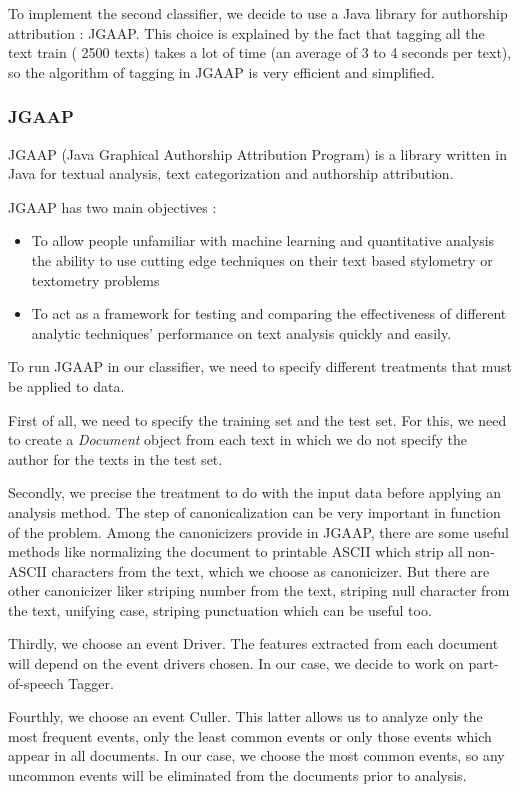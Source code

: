 \label{lab:clas2}


To implement the second classifier, we decide to use a Java library for authorship attribution : JGAAP. This choice is explained by the fact that tagging all the text train ( 2500 texts) takes a lot of time (an average of 3 to 4 seconds per text), so the algorithm of tagging in JGAAP is very efficient and simplified. 

\subsubsection{JGAAP}
JGAAP (Java Graphical Authorship Attribution Program) is a library written in Java for textual analysis, text categorization and authorship attribution.

JGAAP has two main objectives :
\begin{itemize}
	\item To allow people unfamiliar with machine learning and quantitative analysis the ability to use cutting edge techniques on their text based stylometry or textometry problems
    \item To act as a framework for testing and comparing the effectiveness of different analytic techniques' performance on text analysis quickly and easily.
\end{itemize}

To run JGAAP in our classifier, we need to specify different treatments that must be applied to data.

First of all, we need to specify the training set and the test set. For this, we need to create a \textit{Document} object from each text in which we do not specify the author for the texts in the test set.

Secondly, we precise the treatment to do with the input data before applying an analysis method. The step of canonicalization can be very important in function of the problem. Among the canonicizers provide in JGAAP, there are some useful methods like normalizing the document to printable ASCII which strip all non-ASCII characters from the text, which we choose as canonicizer. But there are other canonicizer liker striping number from the text, striping null character from the text, unifying case, striping punctuation which can be useful too.

Thirdly, we choose an event Driver. The features extracted from each document will depend on the event drivers chosen. In our case, we decide to work on part-of-speech Tagger. 

Fourthly, we choose an event Culler. This latter allows us to analyze only the most frequent events, only the least common events or only those events which appear in all documents. In our case, we choose the most common events, so any uncommon events will be eliminated from the documents prior to analysis.

